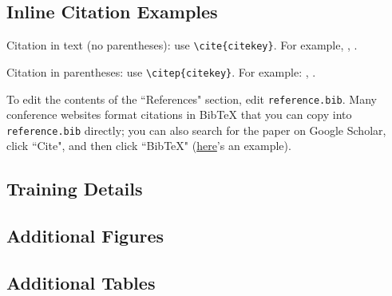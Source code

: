 \documentclass[12pt,letterpaper]{article}
\begin{document}
\subsection{Inline Citation Examples}

Citation in text (no parentheses): use \texttt{{\textbackslash}cite\{citekey\}}. 
For example, \cite{breiman2011}, \cite{devlin2019bert}.

Citation in parentheses: use \texttt{{\textbackslash}citep\{citekey\}}. 
For example: \citep{vaswani2023attention}, \citep{karras2019stylebased}.



\makereference

{\color{blue} To edit the contents of the ``References" section, edit \texttt{reference.bib}. Many conference websites format citations in BibTeX that you can copy into \texttt{reference.bib} directly; you can also search for the paper on Google Scholar, click ``Cite", and then click ``BibTeX" (\href{https://scholar.google.com/scholar?hl=en&as_sdt=0%2C23&q=attention+is+all+you+need&btnG=#d=gs_cit&t=1700436667623&u=%2Fscholar%3Fq%3Dinfo%3A5Gohgn6QFikJ%3Ascholar.google.com%2F%26output%3Dcite%26scirp%3D0%26hl%3Den}{here}'s an example).}





\clearpage
\makeappendix

\subsection{Training Details}

\subsection{Additional Figures}

\subsection{Additional Tables}
\end{document}
